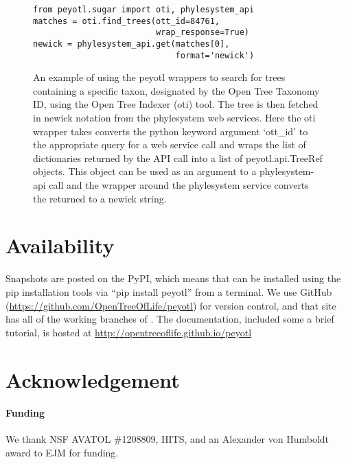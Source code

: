 \begin{figure}[htp]
\begin{verbatim}
from peyotl.sugar import oti, phylesystem_api
matches = oti.find_trees(ott_id=84761,
                         wrap_response=True)
newick = phylesystem_api.get(matches[0],
                             format='newick')
\end{verbatim}

\caption{An example of using the peyotl wrappers to search for trees containing a specific taxon, 
designated by the Open Tree Taxonomy ID, using the Open Tree Indexer (oti) tool.
The tree is then fetched in newick notation from the phylesystem web services.
Here the oti wrapper takes converts the python keyword argument `ott\_id' to
    the appropriate query for a web service call and wraps the list of dictionaries
    returned by the API call into a list of peyotl.api.TreeRef objects.
This object can be used as an argument to a phylesystem-api call and the wrapper around
    the phylesystem service converts the \nexson returned to a newick string.
}
\end{figure}

\section{Availability}
Snapshots are posted on the PyPI, which means that \pey can be installed using the pip
    installation tools via ``pip install peyotl'' from a terminal.
We use GitHub (\url{https://github.com/OpenTreeOfLife/peyotl}) for version control, and
    that site has all of the working branches of \pey.
The documentation, included some a brief tutorial, is hosted at \url{http://opentreeoflife.github.io/peyotl}


\section*{Acknowledgement}

\paragraph{Funding\textcolon} We thank NSF AVATOL \#1208809, HITS, and an Alexander von Humboldt award to EJM for funding.


